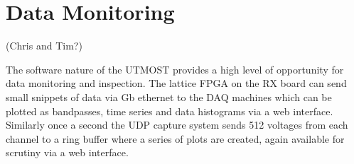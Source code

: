 \section{Data Monitoring }(Chris and Tim?)

The software nature of the UTMOST provides a high level of opportunity for data monitoring and inspection. The lattice FPGA on the RX board can send small snippets of data via Gb ethernet to the DAQ machines which can be plotted as bandpasses, time series and data histograms via a web interface. Similarly once a second the UDP capture system sends 512 voltages from each channel to a ring buffer where a series of plots are created, again available for scrutiny via a web interface.

